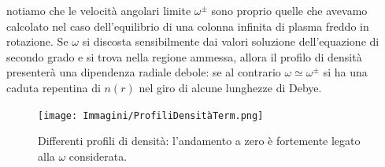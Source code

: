 notiamo che le velocità angolari limite $\omega^\pm$ sono proprio quelle che avevamo calcolato nel caso dell'equilibrio di una 
colonna infinita di plasma freddo in rotazione. Se $\omega$ si discosta sensibilmente dai valori soluzione dell'equazione di secondo 
grado e si trova nella regione ammessa, allora il profilo di densità presenterà una dipendenza radiale debole: se al contrario 
$\omega \simeq \omega^\pm$ si ha una caduta repentina di $n\left(r\right)$ nel giro di alcune lunghezze di Debye.
\begin{figure}[H]
    \centering
    \texttt{[image: Immagini/ProfiliDensitàTerm.png]}
    \caption{Differenti profili di densità: l'andamento a zero è fortemente legato alla $\omega$ considerata. }
    \label{figure: ProfiliDensitàTerm}
\end{figure}
